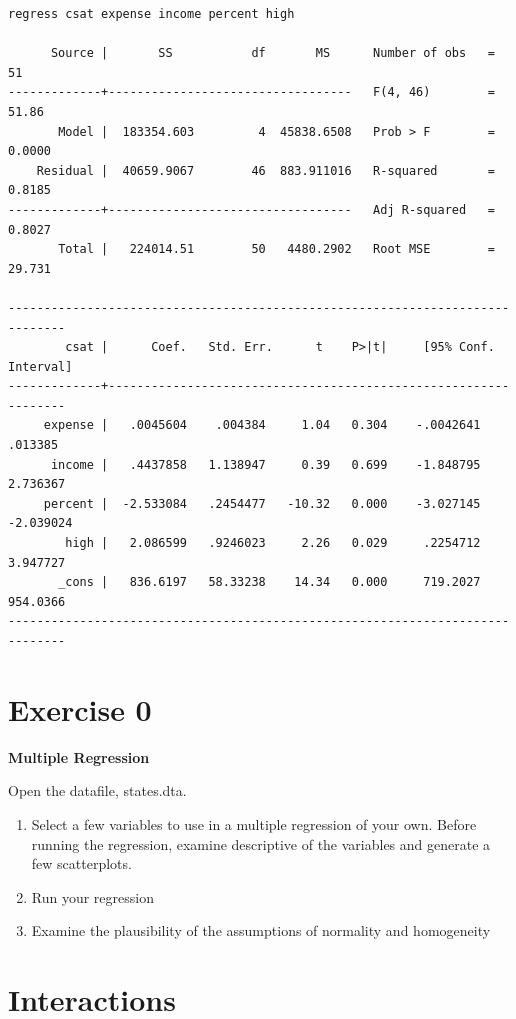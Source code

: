 \documentclass[]{book}
\providecommand{\tightlist}{%
  \setlength{\itemsep}{0pt}\setlength{\parskip}{0pt}}
\begin{document}
\begin{verbatim}
regress csat expense income percent high

      Source |       SS           df       MS      Number of obs   =        51
-------------+----------------------------------   F(4, 46)        =     51.86
       Model |  183354.603         4  45838.6508   Prob > F        =    0.0000
    Residual |  40659.9067        46  883.911016   R-squared       =    0.8185
-------------+----------------------------------   Adj R-squared   =    0.8027
       Total |   224014.51        50   4480.2902   Root MSE        =    29.731

------------------------------------------------------------------------------
        csat |      Coef.   Std. Err.      t    P>|t|     [95% Conf. Interval]
-------------+----------------------------------------------------------------
     expense |   .0045604    .004384     1.04   0.304    -.0042641     .013385
      income |   .4437858   1.138947     0.39   0.699    -1.848795    2.736367
     percent |  -2.533084   .2454477   -10.32   0.000    -3.027145   -2.039024
        high |   2.086599   .9246023     2.26   0.029     .2254712    3.947727
       _cons |   836.6197   58.33238    14.34   0.000     719.2027    954.0366
------------------------------------------------------------------------------
\end{verbatim}

\hypertarget{exercise-0-7}{%
\section{Exercise 0}\label{exercise-0-7}}

\textbf{Multiple Regression}

Open the datafile, states.dta.

\begin{enumerate}
\def\labelenumi{\arabic{enumi}.}
\tightlist
\item
  Select a few variables to use in a multiple regression of your own. Before running the regression, examine descriptive of the variables and generate a few scatterplots.
\item
  Run your regression
\item
  Examine the plausibility of the assumptions of normality and homogeneity
\end{enumerate}

\hypertarget{interactions}{%
\section{Interactions}\label{interactions}}
\end{document}
